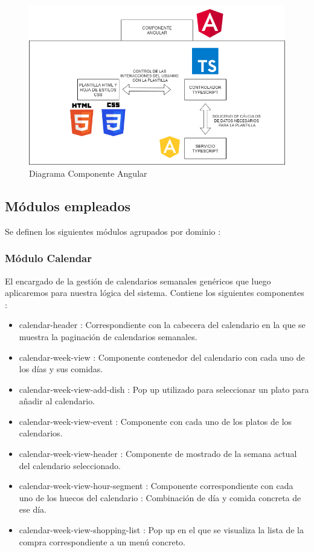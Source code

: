 \documentclass[12pt, a4paper, twoside]{book}
\begin{document}
	\begin{figure}[H]
		\centering
		\includegraphics[width=12cm]{Imagenes/DiagramaComponente.png}
		\caption{Diagrama Componente Angular}\label{Diagrama Componente Angular}
	\end{figure}

	\subsection{Módulos empleados}
	
	Se definen los siguientes módulos agrupados por dominio : 
	
	\subsubsection{Módulo Calendar}
	El encargado de la gestión de calendarios semanales genéricos que luego aplicaremos para nuestra lógica del sistema. Contiene los siguientes componentes : 
	\begin{itemize}
		\item calendar-header : Correspondiente con la cabecera del calendario en la que se muestra la paginación de calendarios semanales.
		\item calendar-week-view : Componente contenedor del calendario con cada uno de los días y sus comidas.
		\item calendar-week-view-add-dish : Pop up utilizado para seleccionar un plato para añadir al calendario.
		\item calendar-week-view-event : Componente con cada uno de los platos de los calendarios.
		\item calendar-week-view-header : Componente de mostrado de la semana actual del calendario seleccionado.
		\item calendar-week-view-hour-segment : Componente correspondiente con cada uno de los huecos del calendario : Combinación de día y comida concreta de ese día.
		\item calendar-week-view-shopping-list : Pop up en el que se visualiza la lista de la compra correspondiente a un menú concreto.
	\end{itemize}
\end{document}
